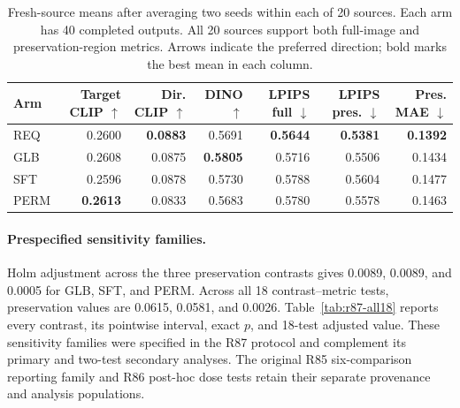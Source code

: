 \begin{table}[t]
\centering\small
\caption{Fresh-source means after averaging two seeds within each of 20 sources. Each arm has 40 completed outputs. All 20 sources support both full-image and preservation-region metrics. Arrows indicate the preferred direction; bold marks the best mean in each column.}
\label{tab:r87-means}
\setlength{\tabcolsep}{4pt}
\begin{tabular}{lrrrrrr}
\toprule
Arm & Target CLIP $\uparrow$ & Dir. CLIP $\uparrow$ & DINO $\uparrow$ & LPIPS full $\downarrow$ & LPIPS pres. $\downarrow$ & Pres. MAE $\downarrow$\\
\midrule
REQ & 0.2600 & \textbf{0.0883} & 0.5691 & \textbf{0.5644} & \textbf{0.5381} & \textbf{0.1392}\\
GLB & 0.2608 & 0.0875 & \textbf{0.5805} & 0.5716 & 0.5506 & 0.1434\\
SFT & 0.2596 & 0.0878 & 0.5730 & 0.5788 & 0.5604 & 0.1477\\
PERM & \textbf{0.2613} & 0.0833 & 0.5683 & 0.5780 & 0.5578 & 0.1463\\
\bottomrule
\end{tabular}
\end{table}

\paragraph{Prespecified sensitivity families.}
Holm adjustment across the three preservation contrasts gives 0.0089, 0.0089, and 0.0005 for GLB, SFT, and PERM. Across all 18 contrast--metric tests, preservation values are 0.0615, 0.0581, and 0.0026. Table~\ref{tab:r87-all18} reports every contrast, its pointwise interval, exact $p$, and 18-test adjusted value. These sensitivity families were specified in the R87 protocol and complement its primary and two-test secondary analyses. The original R85 six-comparison reporting family and R86 post-hoc dose tests retain their separate provenance and analysis populations.

